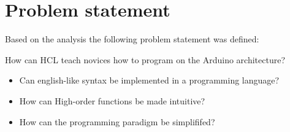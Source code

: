 \section{Problem statement}
Based on the analysis the following problem statement was defined:
\begin{center}
	How can HCL teach novices how to program on the Arduino architecture?

\begin{itemize}
	\item Can english-like syntax be implemented in a programming language?
	\item How can High-order functions be made intuitive?
	\item How can the programming paradigm be simplififed?
\end{itemize}
\end{center}
